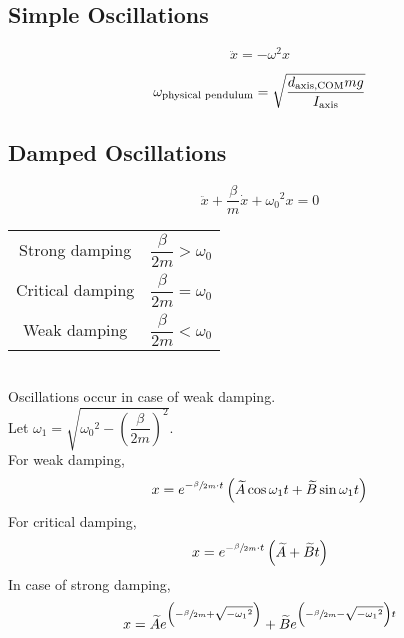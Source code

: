 \documentclass[fleqn, a5paper]{amsart}
\theoremstyle{definition}
\theoremstyle{theorem}
\begin{document}
\subsection{Simple Oscillations}

\begin{equation*}
	\ddot{x} = - \omega^2 x
\end{equation*}

\begin{equation*}
	\omega_{\textnormal{physical pendulum}} = \sqrt{\dfrac{d_{\textnormal{axis,COM}} m g}{I_{\textnormal{axis}}}}
\end{equation*}

\subsection{Damped Oscillations}

\begin{equation*}
	\ddot{x} + \dfrac{\beta}{m} \dot{x} + {\omega_0}^2 x = 0
\end{equation*}

\begin{tabular}{c c}
	Strong damping & $\dfrac{\beta}{2m} > \omega_0$\\[2ex]
	Critical damping & $\dfrac{\beta}{2m} = \omega_0$\\[2ex]
	Weak damping & $\dfrac{\beta}{2m} < \omega_0$\\[2ex]
\end{tabular}\\
Oscillations occur in case of weak damping.\\

Let $\omega_1 = \sqrt{{\omega_0}^2 - \left( \dfrac{\beta}{2m} \right)^2}$.\\
For weak damping,
\begin{equation*}
	x = e^{-\sfrac{\beta}{2m} \cdot t} \left( \widetilde{A} \cos \omega_1 t + \widetilde{B} \sin \omega_1 t \right)
\end{equation*}
For critical damping,
\begin{equation*}
	x = e^{-\sfrac{\beta}{2m} \cdot t} \left( \widetilde{A} + \widetilde{B} t \right)
\end{equation*}
In case of strong damping,
\begin{equation*}
	x = \widetilde{A} e^{\left( -\sfrac{\beta}{2m} + \sqrt{-{\omega_1}^2} \right)} + \widetilde{B} e^{\left( -\sfrac{\beta}{2m} - \sqrt{-{\omega_1}^2} \right) t}
\end{equation*}
\end{document}
